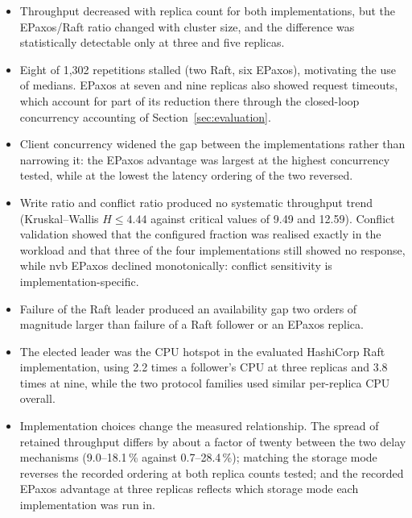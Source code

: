 \begin{itemize}

\item Throughput decreased with replica count for both implementations, but
the EPaxos/Raft ratio changed with cluster size, and the difference was
statistically detectable only at three and five replicas.

\item Eight of 1{,}302 repetitions stalled (two Raft, six EPaxos),
motivating the use of medians. EPaxos at seven and nine replicas also showed
request timeouts, which account for part of its reduction there through the
closed-loop concurrency accounting of Section~\ref{sec:evaluation}.

\item Client concurrency widened the gap between the implementations rather
than narrowing it: the EPaxos advantage was largest at the highest
concurrency tested, while at the lowest the latency ordering of the two
reversed.

\item Write ratio and conflict ratio produced no systematic throughput trend
(Kruskal--Wallis $H\leq4.44$ against critical values of 9.49 and 12.59).
Conflict validation showed that the configured fraction was realised exactly
in the workload and that three of the four implementations still showed no
response, while nvb EPaxos declined monotonically: conflict sensitivity is
implementation-specific.

\item Failure of the Raft leader produced an availability gap two orders of
magnitude larger than failure of a Raft follower or an EPaxos replica.

\item The elected leader was the CPU hotspot in the evaluated HashiCorp Raft
implementation, using 2.2 times a follower's CPU at three replicas and 3.8
times at nine, while the two protocol families used similar per-replica CPU
overall.

\item Implementation choices change the measured relationship. The spread of
retained throughput differs by about a factor of twenty between the two delay
mechanisms (9.0--18.1\,\% against 0.7--28.4\,\%); matching the storage mode
reverses the recorded ordering at both replica counts tested; and the
recorded EPaxos advantage at three replicas reflects which storage mode each
implementation was run in.

\end{itemize}
